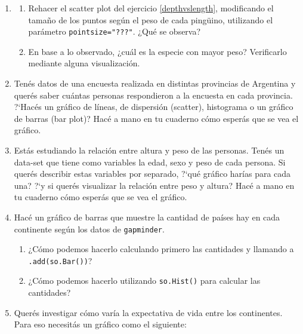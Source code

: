 \documentclass[a4paper,11pt]{article}
\theoremstyle{definition}
\begin{document}
\begin{enumerate}[resume]
\item 
\begin{enumerate}
\item Rehacer el scatter plot del ejercicio \ref{depthvslength}, modificando el tamaño de los puntos según el peso de cada pingüino, utilizando el parámetro \lstinline{pointsize="???"}. ¿Qué se observa?
\item En base a lo observado, ¿cuál es la especie con mayor peso? Verificarlo mediante alguna visualización.
\end{enumerate}


\item Ten\'es datos de una encuesta realizada en distintas provincias de Argentina y quer\'es saber cu\'antas personas respondieron a la encuesta en cada provincia. ?`Hac\'es un gr\'afico de l\'ineas, de dispersi\'on (scatter), histograma o un gr\'afico de barras (bar plot)? Hac\'e a mano en tu cuaderno c\'omo esper\'as que se vea el gr\'afico.

\item Est\'as estudiando la relaci\'on entre altura y peso de las personas. Ten\'es un data-set que tiene como variables la edad, sexo y peso de cada persona. Si quer\'es describir estas variables por separado, ?`qu\'e gr\'afico har\'ias para cada una? ?`y si quer\'es visualizar la relaci\'on entre peso y altura? Hac\'e a mano en tu cuaderno c\'omo esper\'as que se vea el gr\'afico.

\item Hac\'e un gr\'afico de barras que muestre la cantidad de pa\'ises hay en cada continente seg\'un los datos de \lstinline{gapminder}.

\begin{enumerate}
\item ¿Cómo podemos hacerlo calculando primero las cantidades y llamando a \lstinline{.add(so.Bar())}?  
\item ¿Cómo podemos hacerlo utilizando \lstinline{so.Hist()} para calcular las cantidades?
\end{enumerate}

\item Quer\'es investigar c\'omo var\'ia la expectativa de vida entre los continentes. Para eso necesit\'as un gr\'afico como el siguiente:


\end{enumerate}
\end{document}
